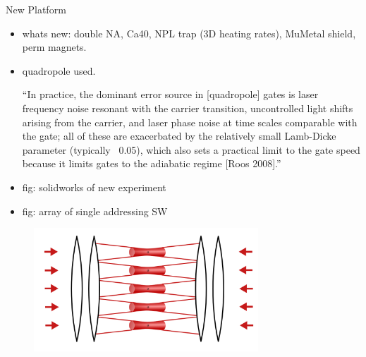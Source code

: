 \documentclass[final]{beamer}
\begin{document}
\begin{frame}{}
\begin{center}
\begin{columns}[t]
\begin{column}{0.49\textwidth}
    \begin{block}{New Platform}
      \begin{itemize}
      \item whats new: double NA, Ca40, NPL trap (3D heating rates), MuMetal shield, perm magnets.
      \item quadropole used.

        ``In practice, the dominant error source in [quadropole] gates is laser
        frequency noise resonant with the carrier transition,
        uncontrolled light shifts arising from the carrier, and laser
        phase noise at time scales comparable with the gate; all of
        these are exacerbated by the relatively small Lamb-Dicke
        parameter (typically ~0.05), which also sets a practical limit
        to the gate speed because it limits gates to the adiabatic
        regime [Roos 2008].''

      \item fig: solidworks of new experiment
      \item fig: array of single addressing SW
      \end{itemize}

      \begin{figure}
        \includegraphics[width=0.75\textwidth]{./figs/array_sw.png}
      \end{figure}

    \end{block}

  \end{column}
\end{columns}
\end{center}

\end{frame}
\end{document}
